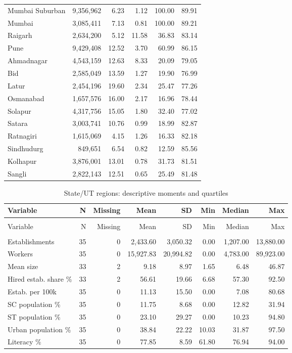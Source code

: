 \documentclass[11pt,a4paper]{report}
\begin{document}
\begin{longtable}{lrrrrr}
Mumbai Suburban & 9,356,962 & 6.23 & 1.12 & 100.00 & 89.91 \\
Mumbai & 3,085,411 & 7.13 & 0.81 & 100.00 & 89.21 \\
Raigarh & 2,634,200 & 5.12 & 11.58 & 36.83 & 83.14 \\
Pune & 9,429,408 & 12.52 & 3.70 & 60.99 & 86.15 \\
Ahmadnagar & 4,543,159 & 12.63 & 8.33 & 20.09 & 79.05 \\
Bid & 2,585,049 & 13.59 & 1.27 & 19.90 & 76.99 \\
Latur & 2,454,196 & 19.60 & 2.34 & 25.47 & 77.26 \\
Osmanabad & 1,657,576 & 16.00 & 2.17 & 16.96 & 78.44 \\
Solapur & 4,317,756 & 15.05 & 1.80 & 32.40 & 77.02 \\
Satara & 3,003,741 & 10.76 & 0.99 & 18.99 & 82.87 \\
Ratnagiri & 1,615,069 & 4.15 & 1.26 & 16.33 & 82.18 \\
Sindhudurg & 849,651 & 6.54 & 0.82 & 12.59 & 85.56 \\
Kolhapur & 3,876,001 & 13.01 & 0.78 & 31.73 & 81.51 \\
Sangli & 2,822,143 & 12.51 & 0.65 & 25.49 & 81.48 \\
\end{longtable}\endgroup
\begingroup\footnotesize\setlength{\tabcolsep}{4pt}
\begin{longtable}{>{\raggedright\arraybackslash}p{3.5cm}rrrrrrr}
\caption{State/\allowbreak{}UT regions: descriptive moments and quartiles}\\\toprule
Variable & N & Missing & Mean & SD & Min & Median & Max \\\midrule\endfirsthead
\multicolumn{8}{l}{\textit{Continued from previous page}}\\\toprule
Variable & N & Missing & Mean & SD & Min & Median & Max \\\midrule\endhead
\midrule\multicolumn{8}{r}{\textit{Continued on next page}}\\\endfoot\bottomrule\endlastfoot
Establishments & 35 & 0 & 2,433.60 & 3,050.32 & 0.00 & 1,207.00 & 13,880.00 \\
Workers & 35 & 0 & 15,927.83 & 20,994.82 & 0.00 & 4,783.00 & 89,923.00 \\
Mean size & 33 & 2 & 9.18 & 8.97 & 1.65 & 6.48 & 46.87 \\
Hired estab. share \% & 33 & 2 & 56.61 & 19.66 & 6.68 & 57.30 & 92.50 \\
Estab. per 100k & 35 & 0 & 11.13 & 15.50 & 0.00 & 7.08 & 80.68 \\
SC population \% & 35 & 0 & 11.75 & 8.68 & 0.00 & 12.82 & 31.94 \\
ST population \% & 35 & 0 & 23.10 & 29.27 & 0.00 & 10.23 & 94.80 \\
Urban population \% & 35 & 0 & 38.84 & 22.22 & 10.03 & 31.87 & 97.50 \\
Literacy \% & 35 & 0 & 77.85 & 8.59 & 61.80 & 76.94 & 94.00 \\
\end{longtable}\endgroup
\end{document}
